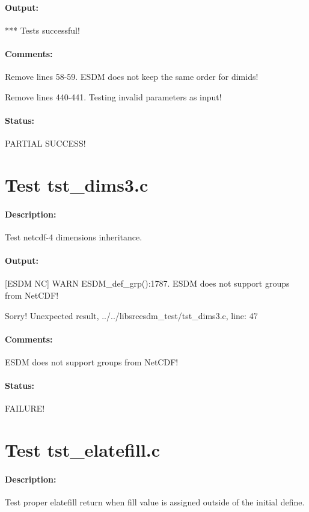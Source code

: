 \paragraph{Output:} *** Tests successful!

\paragraph{Comments:} Remove lines 58-59. ESDM does not keep the same order for dimids!

Remove lines 440-441. Testing invalid parameters as input!

\paragraph{Status:} PARTIAL SUCCESS!

\section{Test tst\_dims3.c}

\paragraph{Description:} Test netcdf-4 dimensions inheritance.

\paragraph{Output:} [ESDM NC] WARN ESDM\_def\_grp():1787. ESDM does not support groups from NetCDF!

Sorry! Unexpected result, ../../libsrcesdm\_test/tst\_dims3.c, line: 47

\paragraph{Comments:} ESDM does not support groups from NetCDF!

\paragraph{Status:} FAILURE!

\section{Test tst\_elatefill.c}

\paragraph{Description:} Test proper elatefill return when fill value is assigned outside of the initial define.

